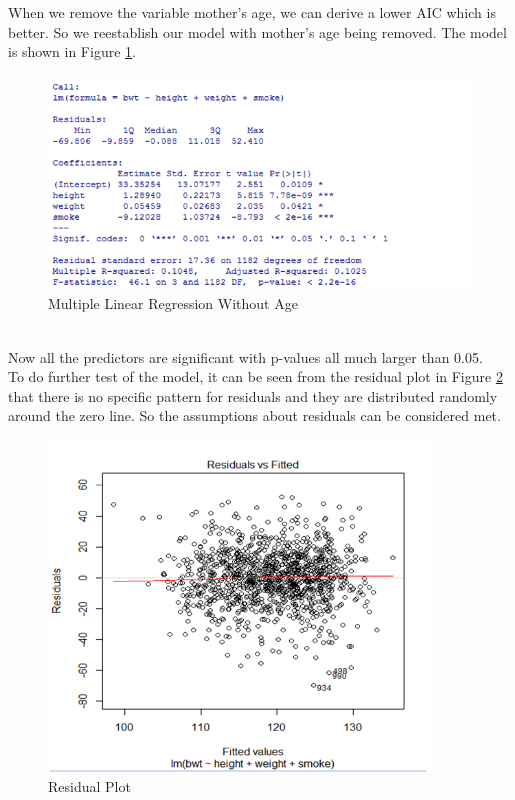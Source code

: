 \documentclass[oneside,12pt]{report}
\begin{document}
\indent When we remove the variable mother’s age, we can derive a lower AIC which is better. So we reestablish our model with mother’s age being removed. The model is shown in Figure \ref{fig:mlr3}.
\begin{figure}[htb]
    \begin{center}
        \includegraphics[width=\textwidth]{mlr3.png}
    \end{center}
    \caption{Multiple Linear Regression Without Age}
    \label{fig:mlr3}
\end{figure}\\
\indent Now all the predictors are significant with p-values all much larger than 0.05.\\
\indent To do further test of the model, it can be seen from the residual plot in Figure \ref{fig:residualplot} that there is no specific pattern for residuals and they are distributed randomly around the zero line. So the assumptions about residuals can be considered met.\\
\begin{figure}[htb]
    \begin{center}
        \includegraphics[width=0.9\textwidth]{residualplot.png}
    \end{center}
    \caption{Residual Plot}
    \label{fig:residualplot}
\end{figure}\\
\end{document}
